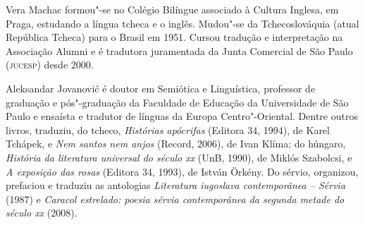 \begin{resumopage}
\item[Vera Machac] formou"-se no Colégio Bilíngue associado à Cultura Inglesa, em Praga, estudando a língua tcheca e o inglês.  
Mudou"-se da Tchecoslováquia (atual República Tcheca) para o Brasil em 1951. Cursou tradução e interpretação na Associação Alumni 
e é tradutora juramentada da Junta Comercial de São Paulo (\textsc{jucesp}) desde 2000. 

\item[Aleksandar Jovanović] é doutor em Semiótica e Linguística, 
professor de graduação e pós"-graduação da Faculdade de Educação da 
Universidade de São Paulo e ensaísta e tradutor de línguas 
da Europa Centro"-Oriental.  Dentre outros livros, traduziu, do tcheco, \textit{Histórias apócrifas} 
(Editora 34, 1994), de Karel Tchápek, e \textit{Nem santos nem anjos} (Record, 2006), de Ivan Klíma; do húngaro, 
\textit{História da literatura universal do século xx} (UnB, 1990), de Miklós Szabolcsi, 
e \textit{A exposição das rosas} (Editora 34, 1993), de István Örkény. Do sérvio, 
organizou, prefaciou e traduziu as antologias \textit{Literatura 
iugoslava contemporânea -- Sérvia} (1987) e \textit{Caracol estrelado: poesia sérvia contemporânea da segunda metade do século xx} (2008).


\end{resumopage}

